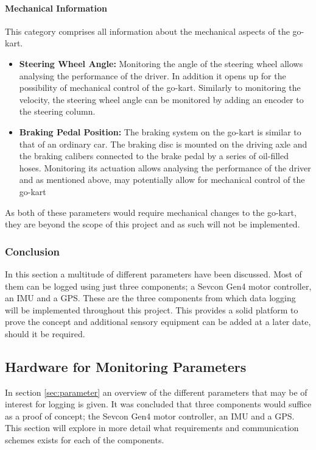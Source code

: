 \paragraph*{Mechanical Information}
This category comprises all information about the mechanical aspects of the go-kart.
\begin{itemize}
	\item \textbf{Steering Wheel Angle:} Monitoring the angle of the steering wheel allows analysing the performance of the driver.
	In addition it opens up for the possibility of mechanical control of the go-kart.
	Similarly to monitoring the velocity, the steering wheel angle can be monitored by adding an encoder to the steering column.
	\item \textbf{Braking Pedal Position:} The braking system on the go-kart is similar to that of an ordinary car.
	The braking disc is mounted on the driving axle and the braking calibers connected to the brake pedal by a series of oil-filled hoses.
	Monitoring its actuation allows analysing the performance of the driver and as mentioned above, may potentially allow for mechanical control of the go-kart
\end{itemize}
As both of these parameters would require mechanical changes to the go-kart, they are beyond the scope of this project and as such will not be implemented.
\subsubsection*{Conclusion}
In this section a multitude of different parameters have been discussed.
Most of them can be logged using just three components; a Sevcon Gen4 motor controller, an IMU and a GPS.
These are the three components from which data logging will be implemented throughout this project.
This provides a solid platform to prove the concept and additional sensory equipment can be added at a later date, should it be required.


























\subsection{Hardware for Monitoring Parameters}
\label{sec:hardware_for_par}
In section \ref{sec:parameter} an overview of the different parameters that may be of interest for logging is given.
It was concluded that three components would suffice as a proof of concept; the Sevcon Gen4 motor controller, an IMU and a GPS.
This section will explore in more detail what requirements and communication schemes exists for each of the components.

